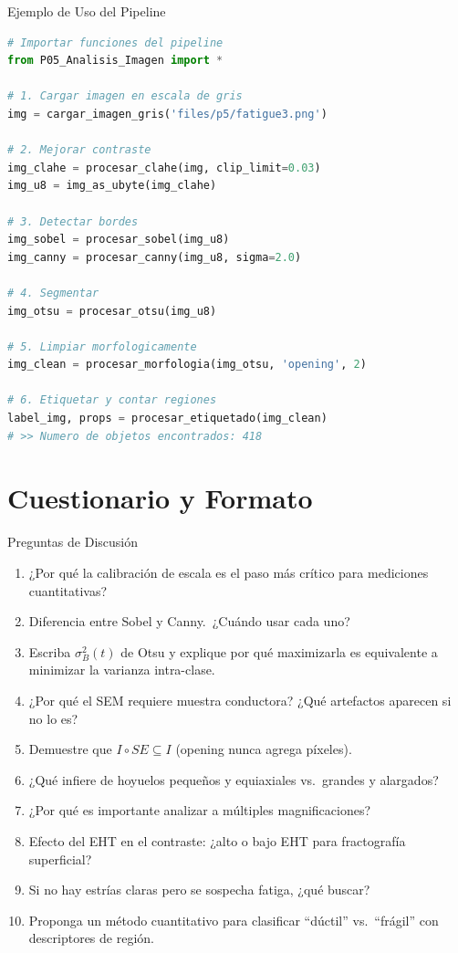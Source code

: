 \documentclass[aspectratio=169,12pt]{beamer}
\begin{document}
\begin{frame}[fragile]{Ejemplo de Uso del Pipeline}
	\begin{lstlisting}[language=Python]
# Importar funciones del pipeline
from P05_Analisis_Imagen import *

# 1. Cargar imagen en escala de gris
img = cargar_imagen_gris('files/p5/fatigue3.png')

# 2. Mejorar contraste
img_clahe = procesar_clahe(img, clip_limit=0.03)
img_u8 = img_as_ubyte(img_clahe)

# 3. Detectar bordes
img_sobel = procesar_sobel(img_u8)
img_canny = procesar_canny(img_u8, sigma=2.0)

# 4. Segmentar
img_otsu = procesar_otsu(img_u8)

# 5. Limpiar morfologicamente
img_clean = procesar_morfologia(img_otsu, 'opening', 2)

# 6. Etiquetar y contar regiones
label_img, props = procesar_etiquetado(img_clean)
# >> Numero de objetos encontrados: 418
	\end{lstlisting}
\end{frame}

\section{Cuestionario y Formato}

\begin{frame}{Preguntas de Discusión}
	\begin{enumerate}\small
		\item ¿Por qué la calibración de escala es el paso más crítico
		      para mediciones cuantitativas?
		\item Diferencia entre Sobel y Canny.\ ¿Cuándo usar cada uno?
		\item Escriba $\sigma_B^2(t)$ de Otsu y explique por qué
		      maximizarla es equivalente a minimizar la varianza
		      intra-clase.
		\item ¿Por qué el SEM requiere muestra conductora?
		      ¿Qué artefactos aparecen si no lo es?
		\item Demuestre que $I \circ SE \subseteq I$
		      (opening nunca agrega píxeles).
		\item ¿Qué infiere de hoyuelos pequeños y equiaxiales vs.\
		      grandes y alargados?
		\item ¿Por qué es importante analizar a múltiples
		      magnificaciones?
		\item Efecto del EHT en el contraste: ¿alto o bajo EHT para
		      fractografía superficial?
		\item Si no hay estrías claras pero se sospecha fatiga,
		      ¿qué buscar?
		\item Proponga un método cuantitativo para clasificar
		      ``dúctil'' vs.\ ``frágil'' con descriptores de región.
	\end{enumerate}
\end{frame}
\end{document}
